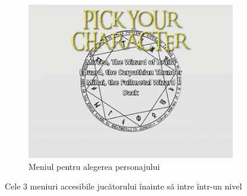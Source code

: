 \documentclass{article}
\begin{document}
\begin{figure}[H]
\begin{subfigure}{0.45\textwidth}
            \includegraphics[width=\textwidth]{character-select}
            \caption{Meniul pentru alegerea personajului}
            \label{fig:third}
        \end{subfigure}

        \caption{Cele 3 meniuri accesibile jucătorului înainte să intre într-un nivel}
    \end{figure}
\end{document}
